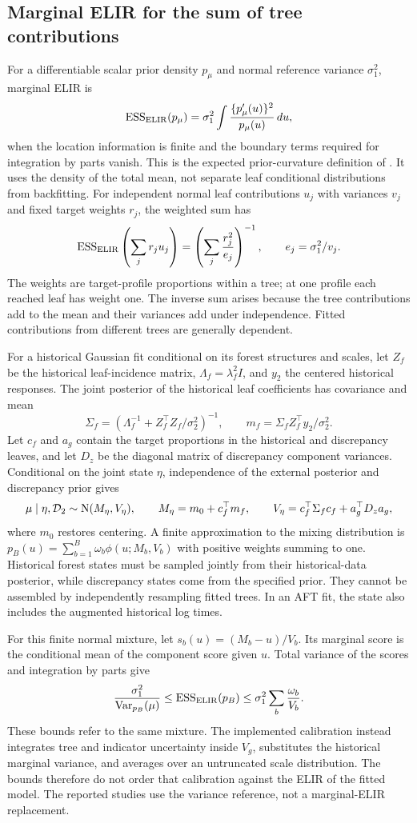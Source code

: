 \subsection{Marginal ELIR for the sum of tree contributions}\label{sec:B.9}
For a differentiable scalar prior density $p_\mu$ and normal reference variance $\sigma_1^2$, marginal ELIR is
\[
\operatorname{ESS}_{\mathrm{ELIR}}(p_\mu)
=\sigma_1^2\int\frac{\{p_\mu'(u)\}^2}{p_\mu(u)}\,du,
\]
when the location information is finite and the boundary terms required for integration by parts vanish. This is the expected prior-curvature definition of \citet{neuenschwander2020}. It uses the density of the total mean, not separate leaf conditional distributions from backfitting. For independent normal leaf contributions $u_j$ with variances $v_j$ and fixed target weights $r_j$, the weighted sum has
\[
\operatorname{ESS}_{\mathrm{ELIR}}\left(\sum_j r_j u_j\right)
=\left(\sum_j\frac{r_j^2}{e_j}\right)^{-1},\qquad e_j=\sigma_1^2/v_j.
\]
The weights are target-profile proportions within a tree; at one profile each reached leaf has weight one. The inverse sum arises because the tree contributions add to the mean and their variances add under independence. Fitted contributions from different trees are generally dependent.

For a historical Gaussian fit conditional on its forest structures and scales, let $Z_f$ be the historical leaf-incidence matrix, $\Lambda_f=\lambda_f^2 I$, and $y_2$ the centered historical responses. The joint posterior of the historical leaf coefficients has covariance and mean
\[
\Sigma_f=(\Lambda_f^{-1}+Z_f^\top Z_f/\sigma_2^2)^{-1},\qquad
m_f=\Sigma_f Z_f^\top y_2/\sigma_2^2.
\]
Let $c_f$ and $a_g$ contain the target proportions in the historical and discrepancy leaves, and let $D_z$ be the diagonal matrix of discrepancy component variances. Conditional on the joint state $\eta$, independence of the external posterior and discrepancy prior gives
\[
\mu\mid\eta,\mathcal D_2\sim\mathrm{N}(M_\eta,V_\eta),\qquad
M_\eta=m_0+c_f^\top m_f,\qquad
V_\eta=c_f^\top\Sigma_f c_f+a_g^\top D_z a_g,
\]
where $m_0$ restores centering. A finite approximation to the mixing distribution is $p_B(u)=\sum_{b=1}^B\omega_b\phi(u;M_b,V_b)$ with positive weights summing to one. Historical forest states must be sampled jointly from their historical-data posterior, while discrepancy states come from the specified prior. They cannot be assembled by independently resampling fitted trees. In an AFT fit, the state also includes the augmented historical log times.

For this finite normal mixture, let $s_b(u)=(M_b-u)/V_b$. Its marginal score is the conditional mean of the component score given $u$. Total variance of the scores and integration by parts give
\[
\frac{\sigma_1^2}{\operatorname{Var}_{p_B}(\mu)}
\leq\operatorname{ESS}_{\mathrm{ELIR}}(p_B)
\leq\sigma_1^2\sum_b\frac{\omega_b}{V_b}.
\]
These bounds refer to the same mixture. The implemented calibration instead integrates tree and indicator uncertainty inside $V_g$, substitutes the historical marginal variance, and averages over an untruncated scale distribution. The bounds therefore do not order that calibration against the ELIR of the fitted model. The reported studies use the variance reference, not a marginal-ELIR replacement.
